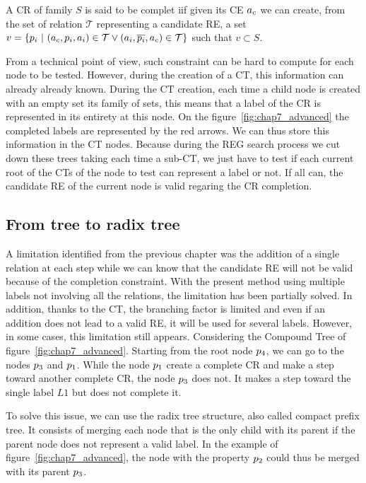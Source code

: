 \begin{theorem} 
\label{the:cd_completion}
A CR of family $S$ is said to be complet iif given its CE $a_c$ we can create, from the set of relation $\mathcal{T}$ representing a candidate RE, a set $v = \{p_i\ |\ (a_c, p_i, a_i) \in \mathcal{T} \lor (a_i, \overline{p_i}, a_c) \in \mathcal{T} \}$ such that $v \subset S$.
\end{theorem}

From a technical point of view, such constraint can be hard to compute for each node to be tested. However, during the creation of a CT, this information can already already known. During the CT creation, each time a child node is created with an empty set its family of sets, this means that a label of the CR is represented in its entirety at this node. On the figure~\ref{fig:chap7_advanced} the completed labels are represented by the red arrows. We can thus store this information in the CT nodes. Because during the REG search process we cut down these trees taking each time a sub-CT, we just have to test if each current root of the CTs of the node to test can represent a label or not. If all can, the candidate RE of the current node is valid regaring the CR completion.

\subsection{From tree to radix tree}

A limitation identified from the previous chapter was the addition of a single relation at each step while we can know that the candidate RE will not be valid because of the completion constraint. With the present method using multiple labels not involving all the relations, the limitation has been partially solved. In addition, thanks to the CT, the branching factor is limited and even if an addition does not lead to a valid RE, it will be used for several labels. However, in some cases, this limitation still appears. Considering the Compound Tree of figure~\ref{fig:chap7_advanced}. Starting from the root node $p_4$, we can go to the nodes $p_3$ and $p_1$. While the node $p_1$ create a complete CR and make a step toward another complete CR, the node $p_3$ does not. It makes a step toward the single label $L1$ but does not complete it.

To solve this issue, we can use the radix tree structure, also called compact prefix tree. It consists of merging each node that is the only child with its parent if the parent node does not represent a valid label. In the example of figure~\ref{fig:chap7_advanced}, the node with the property $p_2$ could thus be merged with its parent $p_3$.

